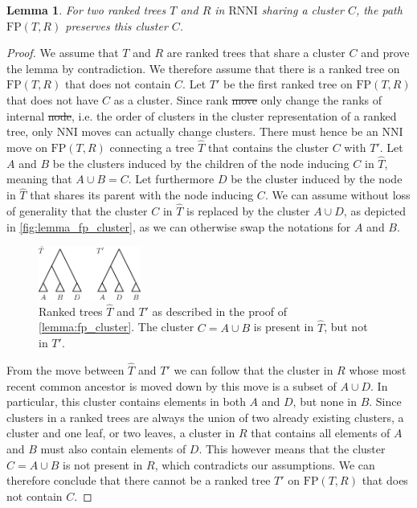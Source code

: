 \documentclass[11pt]{amsart}
\newtheorem{lemma}{Lemma}
\newcommand{\rnni}{\mathrm{RNNI}}
\newcommand{\nni}{\mathrm{NNI}}
\newcommand{\fp}{\mathrm{FP}}
\providecommand{\DIFaddtex}[1]{{\protect\color{blue}\uwave{#1}}} %
\providecommand{\DIFdeltex}[1]{{\protect\color{red}\sout{#1}}}                      %
\providecommand{\DIFaddbegin}{} %
\providecommand{\DIFaddend}{} %
\providecommand{\DIFdelbegin}{} %
\providecommand{\DIFdelend}{} %
\providecommand{\DIFadd}[1]{\texorpdfstring{\DIFaddtex{#1}}{#1}} %
\providecommand{\DIFdel}[1]{\texorpdfstring{\DIFdeltex{#1}}{}} %
\newcommand{\DIFscaledelfig}{0.5}
\newlength{\DIFdelgraphicswidth} %
\newlength{\DIFdelgraphicsheight} %
\newcommand{\DIFaddincludegraphics}[2][]{{\color{blue}\fbox{\DIFOincludegraphics[#1]{#2}}}} %
\newcommand{\DIFdelincludegraphics}[2][]{%
\sbox{\DIFdelgraphicsbox}{\DIFOincludegraphics[#1]{#2}}%
\settoboxwidth{\DIFdelgraphicswidth}{\DIFdelgraphicsbox} %
\settoboxtotalheight{\DIFdelgraphicsheight}{\DIFdelgraphicsbox} %
\scalebox{\DIFscaledelfig}{%
\parbox[b]{\DIFdelgraphicswidth}{\usebox{\DIFdelgraphicsbox}\\[-\baselineskip] \rule{\DIFdelgraphicswidth}{0em}}\llap{\resizebox{\DIFdelgraphicswidth}{\DIFdelgraphicsheight}{%
\setlength{\unitlength}{\DIFdelgraphicswidth}%
\begin{picture}(1,1)%
\thicklines\linethickness{2pt} %
{\color[rgb]{1,0,0}\put(0,0){\framebox(1,1){}}}%
{\color[rgb]{1,0,0}\put(0,0){\line( 1,1){1}}}%
{\color[rgb]{1,0,0}\put(0,1){\line(1,-1){1}}}%
\end{picture}%
}\hspace*{3pt}}} %
} %
\DeclareRobustCommand{\DIFaddbegin}{\DIFOaddbegin \let\includegraphics\DIFaddincludegraphics} %
\DeclareRobustCommand{\DIFaddend}{\DIFOaddend \let\includegraphics\DIFOincludegraphics} %
\DeclareRobustCommand{\DIFdelbegin}{\DIFOdelbegin \let\includegraphics\DIFdelincludegraphics} %
\DeclareRobustCommand{\DIFdelend}{\DIFOaddend \let\includegraphics\DIFOincludegraphics} %
\begin{document}
\begin{lemma}
	For two ranked trees $T$ and $R$ in $\rnni$ sharing a cluster $C$, the path $\fp(T,R)$ preserves this cluster $C$.
	\label{lemma:fp_cluster}
\end{lemma}

\begin{proof}
	We assume that $T$ and $R$ are ranked trees that share a cluster $C$ and prove the lemma by contradiction.
	We therefore assume that there is a ranked tree on $\fp(T,R)$ that does not contain $C$.
	Let $T'$ be the first ranked tree on $\fp(T,R)$ that does not have $C$ as a cluster.
	Since rank \DIFdelbegin \DIFdel{move }\DIFdelend \DIFaddbegin \DIFadd{moves }\DIFaddend only change the ranks of internal \DIFdelbegin \DIFdel{node}\DIFdelend \DIFaddbegin \DIFadd{nodes}\DIFaddend , i.e. the order of clusters in the cluster representation of a ranked tree, only $\nni$ moves can actually change clusters.
	There must hence be an $\nni$ move on $\fp(T,R)$ connecting a tree $\hat T$ that contains the cluster $C$ with $T'$.
	Let $A$ and $B$ be the clusters induced by the children of the node inducing $C$ in $\hat T$, meaning that $A \cup B = C$.
	Let furthermore $D$ be the cluster induced by the node in $\hat T$ that shares its parent with the node inducing $C$.
	We can assume without loss of generality that the cluster $C$ in $\hat T$ is replaced by the cluster $A \cup D$, as depicted in \autoref{fig:lemma_fp_cluster}, as we can otherwise swap the notations for $A$ and $B$.

	\begin{figure}[ht]
		\includegraphics[width=0.3\textwidth]{fp_cluster.eps}
		\caption{Ranked trees $\hat T$ and $T'$ as described in the proof of \autoref{lemma:fp_cluster}.
		The cluster $C = A \cup B$ is present in $\hat T$, but not in $T'$.}
		\label{fig:lemma_fp_cluster}
	\end{figure}

	From the move between $\hat T$ and $T'$ we can follow that the cluster in $R$ whose most recent common ancestor is moved down by this move is a subset of $A \cup D$.
	In particular, this cluster contains elements in both $A$ and $D$, but none in $B$.
	Since clusters in a ranked trees are always the union of two already existing clusters, a cluster and one leaf, or two leaves, a cluster in $R$ that contains all elements of $A$ and $B$ must also contain elements of $D$.
	This however means that the cluster $C = A \cup B$ is not present in $R$, which contradicts our assumptions.
	We can therefore conclude that there cannot be a ranked tree $T'$ on $\fp(T,R)$ that does not contain $C$.
\end{proof}
\end{document}
